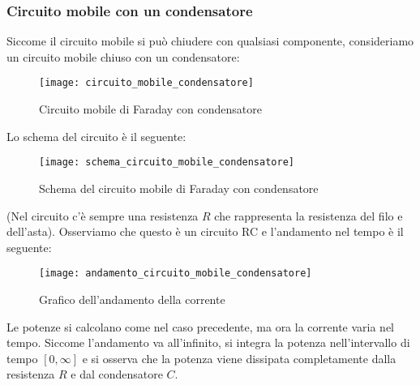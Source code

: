 \documentclass[a4paper]{article}
\begin{document}
\subsubsection{Circuito mobile con un condensatore}
Siccome il circuito mobile si può chiudere con qualsiasi componente, consideriamo
un circuito mobile chiuso con un condensatore:
\begin{figure}[H]
  \centering
  \texttt{[image: circuito\_mobile\_condensatore]}
  \caption{Circuito mobile di Faraday con condensatore}
\end{figure}
\noindent
Lo schema del circuito è il seguente:
\begin{figure}[H]
  \centering
  \texttt{[image: schema\_circuito\_mobile\_condensatore]}
  \caption{Schema del circuito mobile di Faraday con condensatore}
\end{figure}
\noindent
(Nel circuito c'è sempre una resistenza \( R \) che rappresenta la resistenza del filo e
dell'asta). Osserviamo che questo è un circuito RC e l'andamento nel tempo è il seguente:
\begin{figure}[H]
  \centering
  \texttt{[image: andamento\_circuito\_mobile\_condensatore]}
  \caption{Grafico dell'andamento della corrente}
\end{figure}
\noindent
Le potenze si calcolano come nel caso precedente, ma ora la corrente varia nel tempo.
Siccome l'andamento va all'infinito, si integra la potenza nell'intervallo di tempo
\([0, \infty]\) e si osserva che la potenza viene dissipata completamente
dalla resistenza \( R \) e dal condensatore \( C \).
\end{document}
